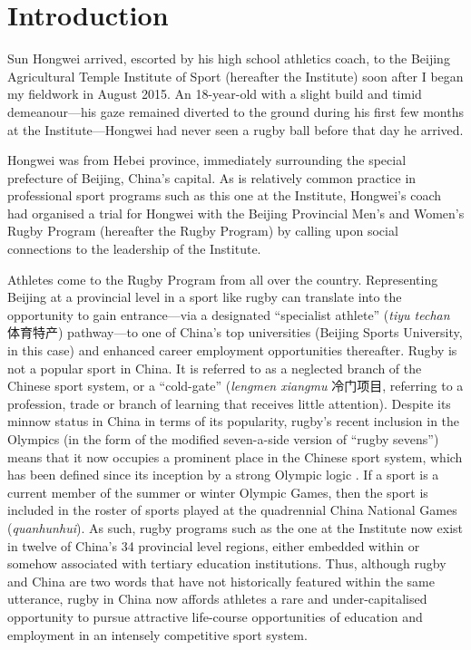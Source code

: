 

\chapter{\label{introduction}Introduction}



\minitoc



Sun Hongwei arrived, escorted by his high school athletics coach, to the Beijing Agricultural Temple Institute of Sport (hereafter the Institute) soon after I began my fieldwork in August 2015.  An 18-year-old with a slight build and timid demeanour---his gaze remained diverted to the ground during his first few months at the Institute---Hongwei had never seen a rugby ball before that day he arrived.

Hongwei was from Hebei province, immediately surrounding the special prefecture of Beijing, China's capital.  As is relatively common practice in professional sport programs such as this one at the Institute, Hongwei's coach had organised a trial for Hongwei with the Beijing Provincial Men’s and Women's Rugby Program (hereafter the Rugby Program) by calling upon social connections to the leadership of the Institute.

Athletes come to the Rugby Program from all over the country.  Representing Beijing at a provincial level in a sport like rugby can translate into the opportunity to gain entrance---via a designated ``specialist athlete'' (\textit{tiyu techan} 体育特产) pathway---to one of China's top universities (Beijing Sports University, in this case) and enhanced career employment opportunities thereafter.  Rugby is not a popular sport in China. It is referred to as a neglected branch of the Chinese sport system, or a ``cold-gate'' (\textit{lengmen xiangmu} 冷门项目, referring to a profession, trade or branch of learning that receives little attention). Despite its minnow status in China in terms of its popularity, rugby's recent inclusion in the Olympics (in the form of the modified seven-a-side version of ``rugby sevens'') means that it now occupies a prominent place in the Chinese sport system, which has been defined since its inception by a strong Olympic logic \citep{Brownell2008}.  If a sport is a current member of the summer or winter Olympic Games, then the sport is included in the roster of sports played at the quadrennial China National Games (\textit{quanhunhui}). As such, rugby programs such as the one at the Institute now exist in twelve of China's 34 provincial level regions, either embedded within or somehow associated with tertiary education institutions. Thus, although rugby and China are two words that have not historically featured within the same utterance, rugby in China now affords athletes a rare and under-capitalised opportunity to pursue attractive life-course opportunities of education and employment in an intensely competitive sport system.

